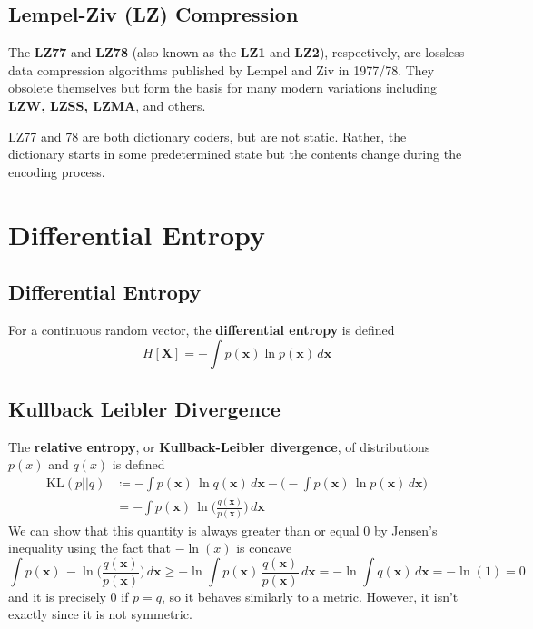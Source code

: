 \documentclass{article}
\begin{document}
  \subsection{Lempel-Ziv (LZ) Compression}

    The \textbf{LZ77} and \textbf{LZ78} (also known as the \textbf{LZ1} and \textbf{LZ2}), respectively, are lossless data compression algorithms published by Lempel and Ziv in 1977/78. They obsolete themselves but form the basis for many modern variations including \textbf{LZW, LZSS, LZMA}, and others. 

    LZ77 and 78 are both dictionary coders, but are not static. Rather, the dictionary starts in some predetermined state but the contents change during the encoding process. 

\section{Differential Entropy}

  \subsection{Differential Entropy}

    \begin{definition}
      For a continuous random vector, the \textbf{differential entropy} is defined 
      \begin{equation}
        H[\mathbf{X}] = - \int p(\mathbf{x}) \ln{p(\mathbf{x})} \,d\mathbf{x}
      \end{equation}
    \end{definition}

  \subsection{Kullback Leibler Divergence}

    The \textbf{relative entropy}, or \textbf{Kullback-Leibler divergence}, of distributions $p(x)$ and $q(x)$ is defined 
    \begin{align*}
      \mathrm{KL}(p || q) & \coloneqq - \int p(\mathbf{x}) \, \ln{q(\mathbf{x})} \,d\mathbf{x} - \bigg( - \int p(\mathbf{x}) \, \ln{p(\mathbf{x})} \,d\mathbf{x} \bigg) \\
      & = - \int p(\mathbf{x}) \, \ln \bigg( \frac{q(\mathbf{x})}{p(\mathbf{x})} \bigg) \,d\mathbf{x} 
    \end{align*}
    We can show that this quantity is always greater than or equal $0$ by Jensen's inequality using the fact that $-\ln(x)$ is concave
    \begin{equation}
      \int p(\mathbf{x}) \, -\ln \bigg( \frac{q(\mathbf{x})}{p(\mathbf{x})} \bigg) \,d\mathbf{x} \geq -\ln \int p(\mathbf{x}) \, \frac{q(\mathbf{x})}{p(\mathbf{x})} \,d\mathbf{x} = -\ln \int q(\mathbf{x}) \,d\mathbf{x} = -\ln(1) = 0
    \end{equation}
    and it is precisely $0$ if $p = q$, so it behaves similarly to a metric. However, it isn't exactly since it is not symmetric. 
\end{document}
